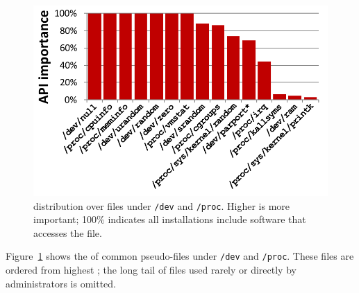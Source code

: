 
\begin{figure}[t]
\centering
\includegraphics[width=1.0\linewidth]{syspop/figures/dev-proc-popularity-by-inst.pdf}
\vspace{-0.25in}
\caption{\usagemetric{} distribution over files under {\tt /dev} and {\tt /proc}.  Higher is more important; 100\% indicates all installations include software that accesses the file. }
\label{fig:dev-proc-popularity}
\end{figure}

Figure~\ref{fig:dev-proc-popularity} shows the \usagemetric{} of common pseudo-files under {\tt/dev} and {\tt /proc}.  
These files are ordered from highest \usagemetric{}; the long tail
of files used rarely or directly by administrators is omitted.

